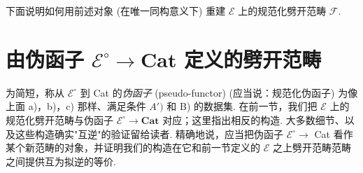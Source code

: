 下面说明如何用前述对象 (在唯一同构意义下) 重建 $\mathcal{E}$ 上的规范化劈开范畴 $\mathcal{F}$.

\section{由伪函子 \texorpdfstring{$\mathcal{E}^{\circ} \to \mathbf{Cat}$}{E^o→Cat} 定义的劈开范畴}

为简短，称从 $\mathcal{E}^{\circ}$ 到 Cat 的\emph{伪函子} (pseudo-functor) (应当说：规范化伪函子) 为像上面 a)，b)，c) 那样、满足条件 $A')$ 和 B) 的数据集. 在前一节，我们把 $\mathcal{E}$ 上的规范化劈开范畴与伪函子 $\mathcal{E}^{\circ} \to \mathbf{Cat}$ 对应；这里指出相反的构造. 大多数细节、以及这些构造确实"互逆"的验证留给读者. 精确地说，应当把伪函子 $\mathcal{E}^{\circ} \to$ Cat 看作某个新范畴的对象，并证明我们的构造在它和前一节定义的 $\mathcal{E}$ 之上劈开范畴范畴之间提供互为拟逆的等价.

